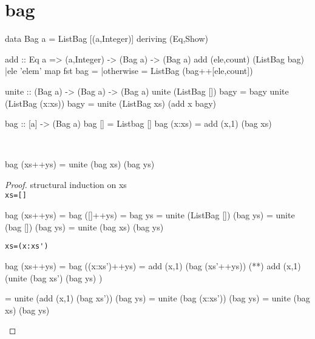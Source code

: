 \section{bag}
\begin{code}
data Bag a = ListBag [(a,Integer)] deriving (Eq,Show)
\end{code}
\begin{code}
add :: Eq a => (a,Integer) -> (Bag a) -> (Bag a)
add (ele,count) (ListBag bag)
    |ele 'elem' map fst bag = 
    |otherwise              = ListBag (bag++[ele,count])
\end{code}
\begin{code}
unite :: (Bag a) -> (Bag a) -> (Bag a)
unite (ListBag [])     bagy = bagy
unite (ListBag (x:xs)) bagy = unite (ListBag xs) (add x bagy)
\end{code}
\begin{code}
bag :: [a] -> (Bag a)
bag []     = Listbag []
bag (x:xs) = add (x,1) (bag xs)
\end{code}
\begin{claim}\ 
\begin{code}
bag (xs++ys) = unite (bag xs) (bag ys) 
\end{code}
\end{claim}
\begin{proof}structural induction on xs\\
\verb|xs=[]|
\begin{code}
bag (xs++ys) = bag ([]++ys)
             = bag ys
             = unite (ListBag []) (bag ys) 
             = unite (bag []) (bag ys) 
             = unite (bag xs) (bag ys) 
\end{code}
\verb|xs=(x:xs')|
\begin{code}
bag (xs++ys) = bag ((x:xs')++ys)
             = add (x,1) (bag (xs'++ys))
             (**) add (x,1) (unite (bag xs') (bag ys) )
             
             
             = unite (add (x,1) (bag xs')) (bag ys)
             = unite (bag (x:xs')) (bag ys)
             = unite (bag xs) (bag ys)
\end{code}
\end{proof}